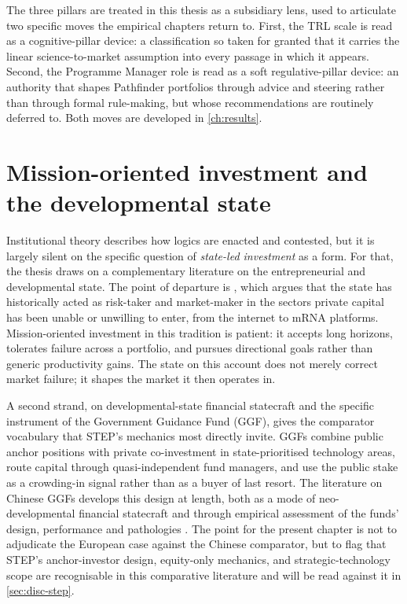 The three pillars are treated in this thesis as a subsidiary lens,
used to articulate two specific moves the empirical chapters return
to. First, the TRL scale is read as a cognitive-pillar device: a
classification so taken for granted that it carries the linear
science-to-market assumption into every passage in which it appears.
Second, the Programme Manager role is read as a soft regulative-pillar
device: an authority that shapes Pathfinder portfolios through advice
and steering rather than through formal rule-making, but whose
recommendations are routinely deferred to. Both moves are developed in
\cref{ch:results}.

\section{Mission-oriented investment and the developmental state}
\label{sec:bg-mazzucato}

Institutional theory describes how logics are enacted and contested,
but it is largely silent on the specific question of \emph{state-led
investment} as a form. For that, the thesis draws on a complementary
literature on the entrepreneurial and developmental state. The point
of departure is \textcite{mazzucato2013entrepreneurial}, which argues that the
state has historically acted as risk-taker and market-maker in the
sectors private capital has been unable or unwilling to enter, from
the internet to mRNA platforms. Mission-oriented investment in this
tradition is patient: it accepts long horizons, tolerates failure
across a portfolio, and pursues directional goals rather than
generic productivity gains. The state on this account does not
merely correct market failure; it shapes the market it then operates
in.

A second strand, on developmental-state financial statecraft and the
specific instrument of the Government Guidance Fund (GGF), gives the
comparator vocabulary that STEP's mechanics most directly invite. GGFs
combine public anchor positions with private co-investment in
state-prioritised technology areas, route capital through
quasi-independent fund managers, and use the public stake as a
crowding-in signal rather than as a buyer of last resort. The
literature on Chinese GGFs develops this design at length, both as a
mode of neo-developmental financial statecraft
\parencite{li2025financing} and through empirical assessment of the
funds' design, performance and pathologies
\parencite{luong2021guidance}. The point for the present chapter is
not to adjudicate the European case against the Chinese comparator,
but to flag that STEP's anchor-investor design, equity-only mechanics,
and strategic-technology scope are recognisable in this comparative
literature and will be read against it in
\cref{sec:disc-step}.


